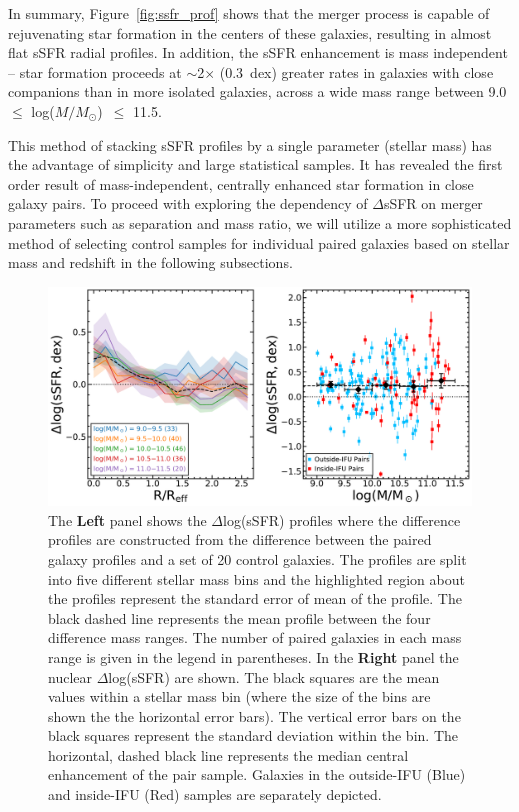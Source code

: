 \documentclass[iop,revtex4,twocolumn,apj,numberedappendix,appendixfloats]{emulateapj}
\newcommand{\logm}{log($M/M_{\odot}$)}
\begin{document}
In summary, Figure~\ref{fig:ssfr_prof} shows that the merger process is capable of rejuvenating star formation in the centers of these galaxies, resulting in almost flat sSFR radial profiles. In addition, the sSFR enhancement is mass independent -- star formation proceeds at $\sim$2$\times$ (0.3~dex) greater rates in galaxies with close companions than in more isolated galaxies, across a wide mass range between 9.0 $\leq$ \logm\ $\leq$ 11.5.

This method of stacking sSFR profiles by a single parameter (stellar mass) has the advantage of simplicity and large statistical samples. It has revealed the first order result of mass-independent, centrally enhanced star formation in close galaxy pairs. To proceed with exploring the dependency of $\Delta$sSFR on merger parameters such as separation and mass ratio, we will utilize a more sophisticated method of selecting control samples for individual paired galaxies based on stellar mass and redshift in the following subsections.  

\begin{figure}
\centering
\includegraphics[width=0.8\linewidth]{fig/ssfr_mass.pdf}
\caption[]{The \textbf{Left} panel shows the $\Delta$log(sSFR) profiles where the difference profiles are constructed from the difference between the paired galaxy profiles and a set of 20 control galaxies. The profiles are split into five different stellar mass bins and the highlighted region about the profiles represent the standard error of mean of the profile. The black dashed line represents the mean profile between the four difference mass ranges. The number of paired galaxies in each mass range is given in the legend in parentheses. In the \textbf{Right} panel the nuclear $\Delta$log(sSFR) are shown. The black squares are the mean values within a stellar mass bin (where the size of the bins are shown the the horizontal error bars). The vertical error bars on the black squares represent the standard deviation within the bin. The horizontal, dashed black line represents the median central enhancement of the pair sample. Galaxies in the outside-IFU (Blue) and inside-IFU (Red) samples are separately depicted.}
\label{fig:ssfr_mass}
\end{figure}
\end{document}
